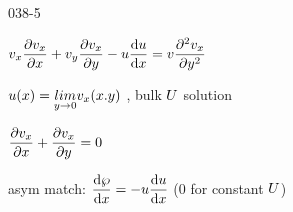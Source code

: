 \begin{mitframe}{038-5}
\begin{listone}
		\begin{listtwo}
            \item $\vvel_{\disp}\dfrac{\partial\vvel_{\disp}}{\partial\disp}+\vvel_{y}\dfrac{\partial\vvel_{\disp}}{\partial{y}}-\forcepot\dfrac{\mathrm{d}\forcepot}{\mathrm{d}\disp}=\vvel\dfrac{\partial^2\vvel_{\disp}}{\partial{y}^2}$
           
            			\begin{listthree}
                        \item $\forcepot(\disp)=\underset{y\rightarrow{0}}{lim}\vvel_{\disp} (\disp.y)$ , bulk  $\uvel$  solution
                                             
						\end{listthree}

			\item$\dfrac{\partial\vvel_{\disp}}{\partial\disp}+\dfrac{\partial\vvel_{\disp}}{\partial{y}}=0$
            
            \item asym match: $\dfrac{\mathrm{d}\dynpress}{\mathrm{d}\disp}=-\forcepot\dfrac{\mathrm{d}\forcepot}{\mathrm{d}\disp}$ (0 for constant $\uvel$)
                 
\end{listtwo}
\end{listone}

\end{mitframe}